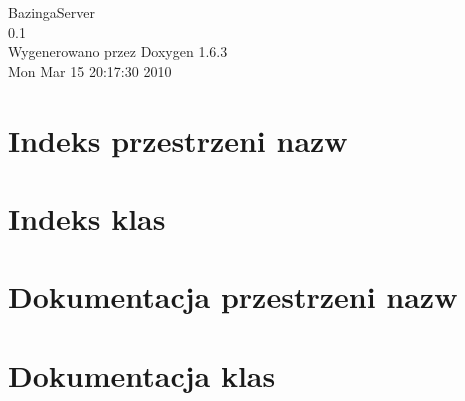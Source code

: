 \documentclass[a4paper]{book}
\begin{document}
\hypersetup{pageanchor=false}
\begin{titlepage}
\vspace*{7cm}
\begin{center}
{\Large BazingaServer \\[1ex]\large 0.1 }\\
\vspace*{1cm}
{\large Wygenerowano przez Doxygen 1.6.3}\\
\vspace*{0.5cm}
{\small Mon Mar 15 20:17:30 2010}\\
\end{center}
\end{titlepage}
\clearemptydoublepage
{}
\tableofcontents
\clearemptydoublepage
{}
\hypersetup{pageanchor=true}
\chapter{Indeks przestrzeni nazw}

\chapter{Indeks klas}

\chapter{Dokumentacja przestrzeni nazw}


\chapter{Dokumentacja klas}














\printindex
\end{document}

